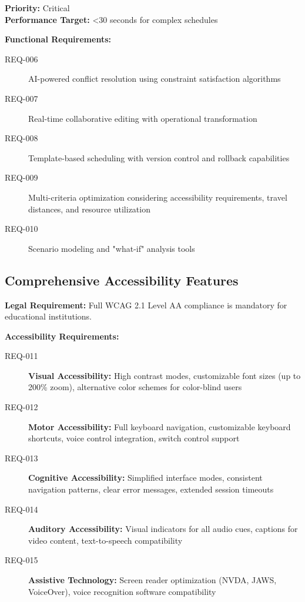 \documentclass[11pt, a4paper]{article}
\begin{document}
\begin{requirementbox}[title=Advanced Scheduling System]
\textbf{Priority:} Critical \\
\textbf{Performance Target:} <30 seconds for complex schedules

\textbf{Functional Requirements:}
\begin{description}
    \item[REQ-006] AI-powered conflict resolution using constraint satisfaction algorithms
    \item[REQ-007] Real-time collaborative editing with operational transformation
    \item[REQ-008] Template-based scheduling with version control and rollback capabilities
    \item[REQ-009] Multi-criteria optimization considering accessibility requirements, travel distances, and resource utilization
    \item[REQ-010] Scenario modeling and "what-if" analysis tools
\end{description}
\end{requirementbox}

\subsection{Comprehensive Accessibility Features}
\label{sec:accessibility_features}

\begin{criticalbox}
\textbf{Legal Requirement:} Full WCAG 2.1 Level AA compliance is mandatory for educational institutions.

\textbf{Accessibility Requirements:}
\begin{description}
    \item[REQ-011] \textbf{Visual Accessibility:} High contrast modes, customizable font sizes (up to 200\% zoom), alternative color schemes for color-blind users
    \item[REQ-012] \textbf{Motor Accessibility:} Full keyboard navigation, customizable keyboard shortcuts, voice control integration, switch control support
    \item[REQ-013] \textbf{Cognitive Accessibility:} Simplified interface modes, consistent navigation patterns, clear error messages, extended session timeouts
    \item[REQ-014] \textbf{Auditory Accessibility:} Visual indicators for all audio cues, captions for video content, text-to-speech compatibility
    \item[REQ-015] \textbf{Assistive Technology:} Screen reader optimization (NVDA, JAWS, VoiceOver), voice recognition software compatibility
\end{description}
\end{criticalbox}
\end{document}
